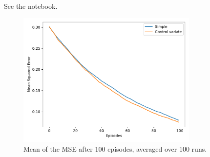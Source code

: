 See the notebook.

\begin{figure}[H]
    \centering
    \includegraphics[width=0.8\textwidth]{chapters_latex/figures/ex_07_10.pdf}
    \captionsetup{labelformat=empty}
    \caption{Mean of the MSE after 100 episodes, averaged over 100 runs.}
\end{figure}
